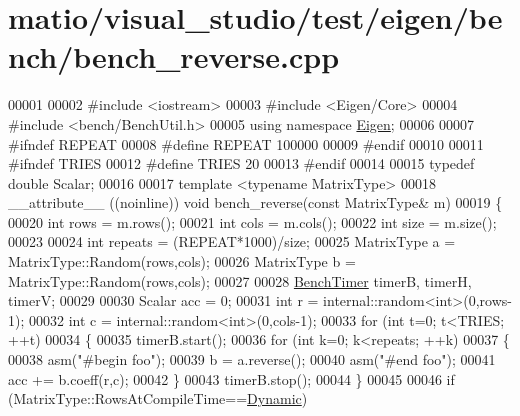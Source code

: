 \hypertarget{matio_2visual__studio_2test_2eigen_2bench_2bench__reverse_8cpp_source}{}\section{matio/visual\+\_\+studio/test/eigen/bench/bench\+\_\+reverse.cpp}
\label{matio_2visual__studio_2test_2eigen_2bench_2bench__reverse_8cpp_source}

\begin{DoxyCode}
00001 
00002 \textcolor{preprocessor}{#include <iostream>}
00003 \textcolor{preprocessor}{#include <Eigen/Core>}
00004 \textcolor{preprocessor}{#include <bench/BenchUtil.h>}
00005 \textcolor{keyword}{using namespace }\hyperlink{namespace_eigen}{Eigen};
00006 
00007 \textcolor{preprocessor}{#ifndef REPEAT}
00008 \textcolor{preprocessor}{#define REPEAT 100000}
00009 \textcolor{preprocessor}{#endif}
00010 
00011 \textcolor{preprocessor}{#ifndef TRIES}
00012 \textcolor{preprocessor}{#define TRIES 20}
00013 \textcolor{preprocessor}{#endif}
00014 
00015 \textcolor{keyword}{typedef} \textcolor{keywordtype}{double} Scalar;
00016 
00017 \textcolor{keyword}{template} <\textcolor{keyword}{typename} MatrixType>
00018 \_\_attribute\_\_ ((noinline)) \textcolor{keywordtype}{void} bench\_reverse(\textcolor{keyword}{const} MatrixType& m)
00019 \{
00020   \textcolor{keywordtype}{int} rows = m.rows();
00021   \textcolor{keywordtype}{int} cols = m.cols();
00022   \textcolor{keywordtype}{int} size = m.size();
00023 
00024   \textcolor{keywordtype}{int} repeats = (REPEAT*1000)/size;
00025   MatrixType a = MatrixType::Random(rows,cols);
00026   MatrixType b = MatrixType::Random(rows,cols);
00027 
00028   \hyperlink{class_eigen_1_1_bench_timer}{BenchTimer} timerB, timerH, timerV;
00029 
00030   Scalar acc = 0;
00031   \textcolor{keywordtype}{int} r = internal::random<int>(0,rows-1);
00032   \textcolor{keywordtype}{int} c = internal::random<int>(0,cols-1);
00033   \textcolor{keywordflow}{for} (\textcolor{keywordtype}{int} t=0; t<TRIES; ++t)
00034   \{
00035     timerB.start();
00036     \textcolor{keywordflow}{for} (\textcolor{keywordtype}{int} k=0; k<repeats; ++k)
00037     \{
00038       \textcolor{keyword}{asm}(\textcolor{stringliteral}{"#begin foo"});
00039       b = a.reverse();
00040       \textcolor{keyword}{asm}(\textcolor{stringliteral}{"#end foo"});
00041       acc += b.coeff(r,c);
00042     \}
00043     timerB.stop();
00044   \}
00045 
00046   \textcolor{keywordflow}{if} (MatrixType::RowsAtCompileTime==\hyperlink{namespace_eigen_ad81fa7195215a0ce30017dfac309f0b2}{Dynamic})

\end{DoxyCode}
